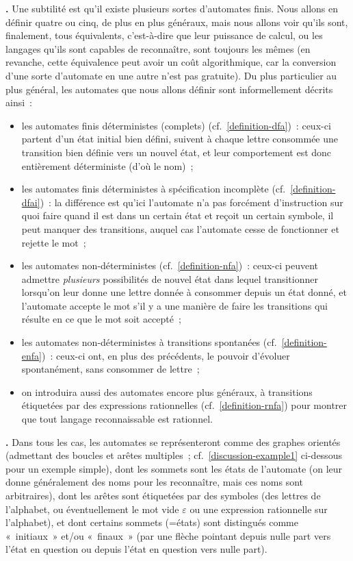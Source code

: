 \documentclass[12pt,a4paper]{article}
\theoremstyle{definition}
\newcommand\thingy{%
\refstepcounter{comcnt}\medskip\noindent\textbf{\thecomcnt.} }
\begin{document}
\thingy Une subtilité est qu'il existe plusieurs sortes d'automates
finis.  Nous allons en définir quatre ou cinq, de plus en plus
généraux, mais nous allons voir qu'ils sont, finalement, tous
équivalents, c'est-à-dire que leur puissance de calcul, ou les
langages qu'ils sont capables de reconnaître, sont toujours les mêmes
(en revanche, cette équivalence peut avoir un coût algorithmique, car
la conversion d'une sorte d'automate en une autre n'est pas gratuite).
Du plus particulier au plus général, les automates que nous allons
définir sont informellement décrits ainsi :
\begin{itemize}
\item les automates finis déterministes (complets)
  (cf. \ref{definition-dfa}) : ceux-ci partent d'un état initial bien
  défini, suivent à chaque lettre consommée une transition bien
  définie vers un nouvel état, et leur comportement est donc
  entièrement déterministe (d'où le nom) ;
\item les automates finis déterministes à spécification incomplète
  (cf. \ref{definition-dfai}) : la différence est qu'ici l'automate
  n'a pas forcément d'instruction sur quoi faire quand il est dans un
  certain état et reçoit un certain symbole, il peut manquer des
  transitions, auquel cas l'automate cesse de fonctionner et rejette
  le mot ;
\item les automates non-déterministes (cf. \ref{definition-nfa}) :
  ceux-ci peuvent admettre \emph{plusieurs} possibilités de nouvel
  état dans lequel transitionner lorsqu'on leur donne une lettre
  donnée à consommer depuis un état donné, et l'automate accepte le
  mot s'il y a une manière de faire les transitions qui résulte en ce
  que le mot soit accepté ;
\item les automates non-déterministes à transitions spontanées
  (cf. \ref{definition-enfa}) : ceux-ci ont, en plus des précédents,
  le pouvoir d'évoluer spontanément, sans consommer de lettre ;
\item on introduira aussi des automates encore plus généraux, à
  transitions étiquetées par des expressions rationnelles
  (cf. \ref{definition-rnfa}) pour montrer que tout langage
  reconnaissable est rationnel.
\end{itemize}

\thingy Dans tous les cas, les automates se représenteront comme des
graphes orientés (admettant des boucles et arêtes multiples ;
cf. \ref{discussion-example1} ci-dessous pour un exemple simple), dont
les sommets sont les états de l'automate (on leur donne généralement
des noms pour les reconnaître, mais ces noms sont arbitraires), dont
les arêtes sont étiquetées par des symboles (des lettres de
l'alphabet, ou éventuellement le mot vide $\varepsilon$ ou une
expression rationnelle sur l'alphabet), et dont certains sommets
(=états) sont distingués comme « initiaux » et/ou « finaux » (par une
flèche pointant depuis nulle part vers l'état en question ou depuis
l'état en question vers nulle part).
\end{document}
